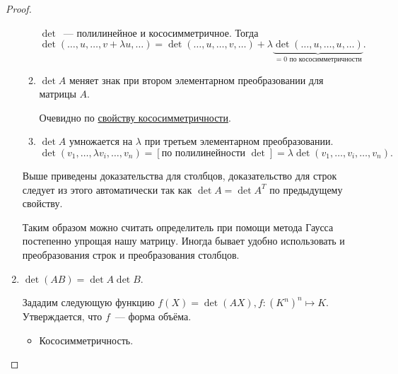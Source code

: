 \begin{proof}
\begin{enumerate}
\begin{enumerate}
                    $\det$~--- полилинейное и кососимметричное. Тогда
                    \[
                        \det(\dots, u, \dots, v + \lambda u, \dots) = \det(\dots, u, \dots, v,\dots) +
                        \lambda \underbrace{\det(\dots, u,\dots, u,\dots)}_{=0\text{ по кососимметричности}}
                    .\]
                \item $\det A$ меняет знак при втором элементарном преобразовании для матрицы $A$.
                    
                    Очевидно по \hyperref[stm:Свойство кососимметричного отображения]{свойству кососимметричности}.
                \item
                    $\det A$ умножается на $\lambda$ при третьем элементарном преобразовании.
                    \[
                        \det (v_1,\dots, \lambda v_i, \dots, v_n) =[\text{по полилинейности } \det]= \lambda \det (v_1, \dots, v_i, \dots, v_n)
                    .\]
            \end{enumerate}
            Выше приведены доказательства для столбцов, доказательство для строк следует из этого
            автоматически так как $\det A = \det A^T$ по предыдущему свойству.
            \begin{remark}
                Таким образом можно считать определитель при помощи метода Гаусса постепенно 
                упрощая нашу матрицу. 
                Иногда бывает удобно использовать и преобразования строк и преобразования столбцов.
            \end{remark}
        \item
            $\det(AB) = \det A \det B$.

            Зададим следующую функцию $f(X) = \det(AX), f\colon (K^n)^n \mapsto K$. Утверждается, что $f$~--- форма объёма.
             \begin{itemize}
                 \item Кососимметричность. 


\end{itemize}
\end{enumerate}
\end{proof}
